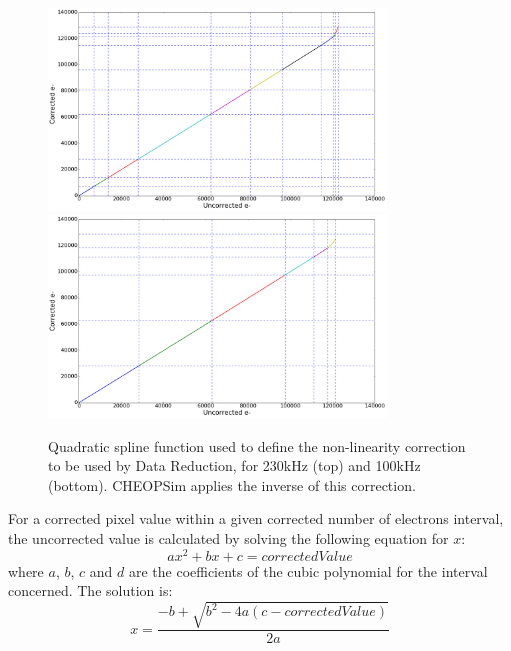 \documentclass[11pt]{article}      %
\begin{document}
\begin{figure}[hbtp]
  \begin{center}
    \includegraphics[width=0.8\textwidth]{ccdNonLinearity1_2018.png}
    \includegraphics[width=0.8\textwidth]{ccdNonLinearity1_100kHz_2018.png}
    \caption{Quadratic spline function used to define the non-linearity correction to be used by Data Reduction, for 230kHz (top) and 100kHz (bottom). CHEOPSim applies the inverse of this correction.}
    \label{fig:ccdNonLinearity1}
  \end{center}
\end{figure}

For a corrected pixel value within a given corrected number of electrons interval, the uncorrected value is calculated by solving the following equation for $x$:
$$ax^2 + bx + c = correctedValue$$
where $a$, $b$, $c$ and $d$ are the coefficients of the cubic polynomial for the interval concerned. The solution is:
$$x=\frac{-b+\sqrt{b^2-4a(c-correctedValue)}}{2a}$$
\end{document}
